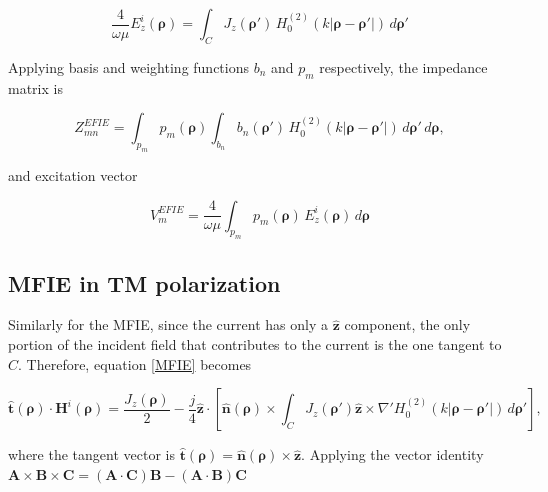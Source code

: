 \documentclass[11pt,a4paper,twoside,pdf]{article}
\numberwithin{equation}{section}
\begin{document}
\begin{equation}
\frac{4}{\omega \mu}
E_z^i(\boldsymbol{\rho})
=
\int_C
J_z(\boldsymbol{\rho}')
\, H_0^{(2)}\!\left( k \lvert \boldsymbol{\rho} - \boldsymbol{\rho}' \rvert \right)
\, d\boldsymbol{\rho}'
\end{equation}




Applying basis and weighting functions $b_n$ and $p_m$ respectively, the impedance matrix is

\begin{equation}
Z^{EFIE}_{mn}
=
\int_{p_m}
p_m(\boldsymbol{\rho})
\int_{b_n}
b_n(\boldsymbol{\rho}')
\, H_0^{(2)}\!\left( k \lvert \boldsymbol{\rho} - \boldsymbol{\rho}' \rvert \right)
\, d\boldsymbol{\rho}'
\, d\boldsymbol{\rho},
\label{ZEFIE}
\end{equation}

and excitation vector

\begin{equation}
V^{EFIE}_m
=
\frac{4}{\omega \mu}
\int_{p_m}
p_m(\boldsymbol{\rho})
\, E_z^i(\boldsymbol{\rho})
\, d\boldsymbol{\rho}
\label{VmEFIE}
\end{equation}

\subsection{MFIE in TM polarization}

Similarly for the MFIE, since the current has only a $\boldsymbol{\hat{z}}$ component, the only portion of the incident field that contributes to the current is the one tangent to $C$. Therefore, equation \ref{MFIE} becomes

\begin{equation}
\hat{\mathbf{t}}(\boldsymbol{\rho}) \cdot \mathbf{H}^i(\boldsymbol{\rho})
=
\frac{J_z(\boldsymbol{\rho})}{2}
-
\frac{j}{4}
\hat{\mathbf{z}} \cdot
\left[
\hat{\mathbf{n}}(\boldsymbol{\rho}) \times
\int_{C}
J_z(\boldsymbol{\rho}')
\hat{\mathbf{z}} \times
\nabla' H_0^{(2)}\!\left( k \lvert \boldsymbol{\rho} - \boldsymbol{\rho}' \rvert \right)
\, d\boldsymbol{\rho}'
\right],
\label{MFIEtan}
\end{equation}

where the tangent vector is
$\hat{\mathbf{t}}(\boldsymbol{\rho}) = \hat{\mathbf{n}}(\boldsymbol{\rho}) \times \hat{\mathbf{z}}$.
Applying the vector identity $\mathbf{A} \times \mathbf{B} \times \mathbf{C}
=
(\mathbf{A} \cdot \mathbf{C}) \mathbf{B}
-
(\mathbf{A} \cdot \mathbf{B}) \mathbf{C}$
\end{document}
